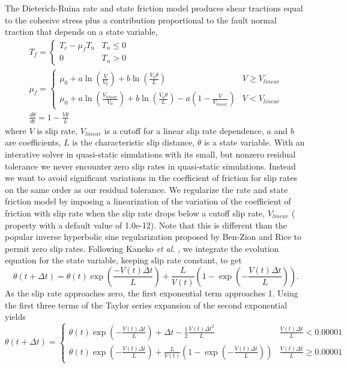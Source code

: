 The Dieterich-Ruina rate and state friction model produces shear tractions
equal to the cohesive stress plus a contribution proportional to the
fault normal traction that depends on a state variable,
\begin{gather}
T_{f}=\begin{cases}
T_{c}-\mu_{f}T_{n} & T_{n}\leq0\\
0 & T_{n}>0
\end{cases}\\
\mu_{f}=\begin{cases}
\mu_{0}+a\ln\left(\frac{V}{V_{0}}\right)+b\ln\left(\frac{V_{0}\theta}{L}\right) & V\ge V_{\mathit{linear}}\\
\mu_{0}+a\ln\left(\frac{V_{linear}}{V_{0}}\right)+b\ln\left(\frac{V_{0}\theta}{L}\right)-a\left(1-\frac{V}{V_{linear}}\right) & V<V_{linear}
\end{cases}\\
\frac{d\theta}{dt}=1-\frac{V\theta}{L}
\end{gather}
where $V$ is slip rate, $V_{linear}$ is a cutoff for a linear slip
rate dependence, $a$ and $b$ are coefficients, $L$ is the characteristic
slip distance, $\theta$ is a state variable. With an interative solver
in quasi-static simulations with its small, but nonzero residual tolerance
we never encounter zero slip rates in quasi-static simulations. Instead
we want to avoid significant variations in the coefficient of friction
for slip rates on the same order as our residual tolerance. We regularize
the rate and state friction model by imposing a linearization of the
variation of the coefficient of friction with slip rate when the slip
rate drops below a cutoff slip rate, $V_{linear}$ (
property with a default value of 1.0e-12). Note that this is different
than the popular inverse hyperbolic sine regularization proposed by
Ben-Zion and Rice \cite{BenZion:Rice:1997} to permit zero slip rates.
Following Kaneko \textit{et al.} \cite{Kaneko:etal:2008}, we integrate
the evolution equation for the state variable, keeping slip rate constant,
to get
\begin{equation}
\theta(t+\Delta t)=\theta(t)\exp\left(\frac{-V(t)\Delta t}{L}\right)+\frac{L}{V(t)}\left(1-\exp\left(-\frac{V(t)\Delta t}{L}\right)\right).
\end{equation}
As the slip rate approaches zero, the first exponential term approaches
1. Using the first three terms of the Taylor series expansion of the
second exponential yields
\begin{equation}
\theta(t+\Delta t)=\begin{cases}
\theta(t)\exp\left(-\frac{V(t)\Delta t}{L}\right)+\Delta t-\frac{1}{2}\frac{V(t)\Delta t^{2}}{L} & \frac{V(t)\Delta t}{L}<0.00001\\
\theta(t)\exp\left(-\frac{V(t)\Delta t}{L}\right)+\frac{L}{V(t)}\left(1-\exp\left(-\frac{V(t)\Delta t}{L}\right)\right) & \frac{V(t)\Delta t}{L}\ge0.00001
\end{cases}
\end{equation}

